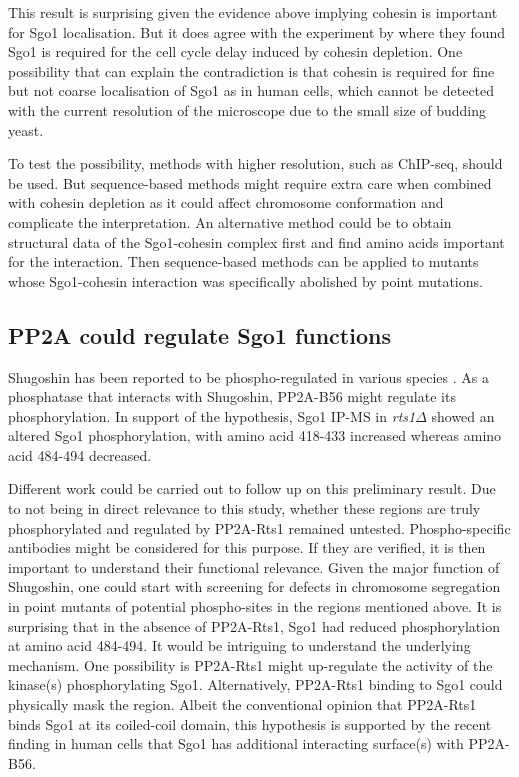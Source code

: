 This result is surprising given the evidence above implying cohesin is important for Sgo1 localisation. But it does agree with the experiment by \cite{Indjeian2005a} where they found Sgo1 is required for the cell cycle delay induced by cohesin depletion. One possibility that can explain the contradiction is that cohesin is required for fine but not coarse localisation of Sgo1 as in human cells, which cannot be detected with the current resolution of the microscope due to the small size of budding yeast. 

To test the possibility, methods with higher resolution, such as ChIP-seq, should be used. But sequence-based methods might require extra care when combined with cohesin depletion as it could affect chromosome conformation and complicate the interpretation. An alternative method could be to obtain structural data of the Sgo1-cohesin complex first and find amino acids important for the interaction. Then sequence-based methods can be applied to mutants whose Sgo1-cohesin interaction was specifically abolished by point mutations. 

\subsection{PP2A could regulate Sgo1 functions}

Shugoshin has been reported to be phospho-regulated in various species \citep{Llano2008Shugoshin-2Mice, Tanno2010, Rattani2013Sgol2Oocytes, Pouwels2007ShugoshinPlk1, Kawashima2007, Lee2014RegulationPhosphorylation, Liu2013, Liu2013a, Clarke2005, Resnick2006INCENPDrosophila, Nogueira2014, Yahya2020}. As a phosphatase that interacts with Shugoshin, PP2A-B56 might regulate its phosphorylation. In support of the hypothesis, Sgo1 IP-MS in \textit{rts1$\Delta$} showed an altered Sgo1 phosphorylation, with amino acid 418-433 increased whereas amino acid 484-494 decreased. 

Different work could be carried out to follow up on this preliminary result. Due to not being in direct relevance to this study, whether these regions are truly phosphorylated and regulated by PP2A-Rts1 remained untested. Phospho-specific antibodies might be considered for this purpose. If they are verified, it is then important to understand their functional relevance. Given the major function of Shugoshin, one could start with screening for defects in chromosome segregation in point mutants of potential phospho-sites in the regions mentioned above. It is surprising that in the absence of PP2A-Rts1, Sgo1 had reduced phosphorylation at amino acid 484-494. It would be intriguing to understand the underlying mechanism. One possibility is PP2A-Rts1 might up-regulate the activity of the kinase(s) phosphorylating Sgo1. Alternatively, PP2A-Rts1 binding to Sgo1 could physically mask the region. Albeit the conventional opinion that PP2A-Rts1 binds Sgo1 at its coiled-coil domain, this hypothesis is supported by the recent finding in human cells that Sgo1 has additional interacting surface(s) with PP2A-B56. 

